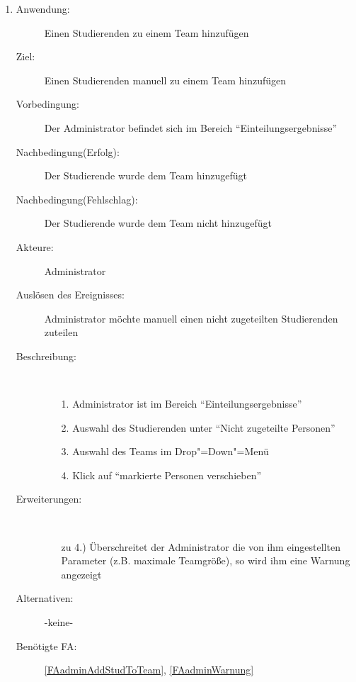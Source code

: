 \documentclass[parskip=full]{scrartcl}
\newcommand{\swtLabel}[1]{\textbf{/#1\arabic*0/}}
\begin{document}
\begin{enumerate} [label=\swtLabel{A}]
  \item \label{UCadminAddStudToTeam}
    \begin{description}
  	\item[Anwendung:] Einen Studierenden zu einem Team hinzufügen
  	\item[Ziel:] Einen Studierenden manuell zu einem Team hinzufügen
  	\item[Vorbedingung:] Der Administrator befindet sich im Bereich
  	\enquote{Einteilungsergebnisse}
  	\item[Nachbedingung(Erfolg):] Der Studierende wurde dem Team hinzugefügt
  	\item[Nachbedingung(Fehlschlag):] Der Studierende wurde dem Team nicht
  	hinzugefügt
  	\item[Akteure:] Administrator
  	\item[Auslösen des Ereignisses:] Administrator möchte manuell einen nicht
  	zugeteilten Studierenden zuteilen
  	\item[Beschreibung:]~
  	\begin{enumerate}
  	  \item[1.] Administrator ist im Bereich \enquote{Einteilungsergebnisse}
      \item[2.] Auswahl des Studierenden unter \enquote{Nicht zugeteilte
      Personen}
      \item[3.] Auswahl des Teams im Drop"=Down"=Menü
      \item[4.] Klick auf \enquote{markierte Personen verschieben}
  	\end{enumerate}
  	\item[Erweiterungen:]~
  	\begin{enumerate}
  	  \item [zu 4.)] Überschreitet der Administrator die von ihm eingestellten
  	  Parameter (z.B. maximale Teamgröße), so wird ihm eine Warnung angezeigt
  	\end{enumerate}  
  	\item[Alternativen:] -keine-
  	\item[Benötigte FA:] \ref{FAadminAddStudToTeam}, \ref{FAadminWarnung}
  \end{description}
  

\end{enumerate}
\end{document}
